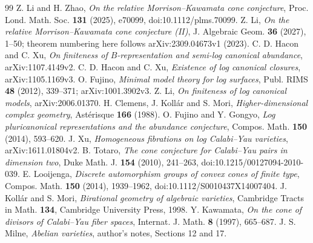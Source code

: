 \documentclass[11pt]{article}
\begin{document}
\begin{thebibliography}{99}
 Z. Li and H. Zhao, \emph{On the relative Morrison--Kawamata cone conjecture}, Proc. Lond. Math. Soc. \textbf{131} (2025), e70099, doi:10.1112/plms.70099.
 Z. Li, \emph{On the relative Morrison--Kawamata cone conjecture (II)}, J. Algebraic Geom. \textbf{36} (2027), 1--50; theorem numbering here follows arXiv:2309.04673v1 (2023).
 C. D. Hacon and C. Xu, \emph{On finiteness of $B$-representation and semi-log canonical abundance}, arXiv:1107.4149v2.
 C. D. Hacon and C. Xu, \emph{Existence of log canonical closures}, arXiv:1105.1169v3.
 O. Fujino, \emph{Minimal model theory for log surfaces}, Publ. RIMS \textbf{48} (2012), 339--371; arXiv:1001.3902v3.
 Z. Li, \emph{On finiteness of log canonical models}, arXiv:2006.01370.
 H. Clemens, J. Koll\'ar and S. Mori, \emph{Higher-dimensional complex geometry}, Ast\'erisque \textbf{166} (1988).
 O. Fujino and Y. Gongyo, \emph{Log pluricanonical representations and the abundance conjecture}, Compos. Math. \textbf{150} (2014), 593--620.
 J. Xu, \emph{Homogeneous fibrations on log Calabi--Yau varieties}, arXiv:1611.01804v2.
 B. Totaro, \emph{The cone conjecture for Calabi--Yau pairs in dimension two}, Duke Math. J. \textbf{154} (2010), 241--263, doi:10.1215/00127094-2010-039.
 E. Looijenga, \emph{Discrete automorphism groups of convex cones of finite type}, Compos. Math. \textbf{150} (2014), 1939--1962, doi:10.1112/S0010437X14007404.
 J. Koll\'ar and S. Mori, \emph{Birational geometry of algebraic varieties}, Cambridge Tracts in Math. \textbf{134}, Cambridge University Press, 1998.
 Y. Kawamata, \emph{On the cone of divisors of Calabi--Yau fiber spaces}, Internat. J. Math. \textbf{8} (1997), 665--687.
 J. S. Milne, \emph{Abelian varieties}, author's notes, Sections 12 and 17.
\end{thebibliography}
\end{document}
